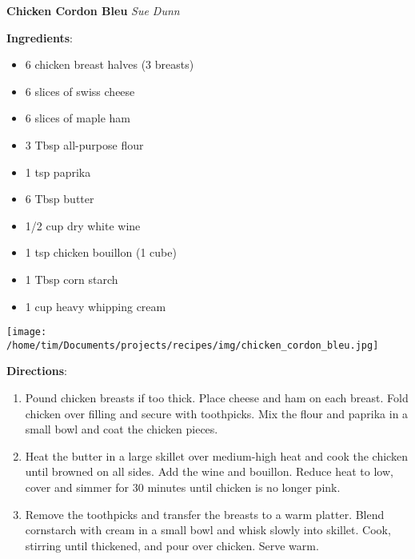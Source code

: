 \documentclass[11pt, twoside, openany]{book}
\begin{document}
\noindent\begin{minipage}[t]{\linewidth}%
{\Large\textbf{Chicken Cordon Bleu}} \label{chicken-cordon-bleu}\hfill\textit{Sue Dunn}\\
\noindent\begin{minipage}[t]{0.78\linewidth}%
\textbf{Ingredients}:\vspace{-3mm}
\begin{multicols}{2}
\begin{itemize}\setlength\itemsep{-1mm}
\item 6 chicken breast halves (3 breasts)
\item 6 slices of swiss cheese
\item 6 slices of maple ham
\item 3 Tbsp all-purpose flour
\item 1 tsp paprika
\item 6 Tbsp butter
\item 1/2 cup dry white wine
\item 1 tsp chicken bouillon (1 cube)
\item 1 Tbsp corn starch
\item 1 cup heavy whipping cream
\end{itemize}
\end{multicols}
\end{minipage}
\noindent\begin{minipage}[t]{0.18\linewidth}
\centering \strut\vspace*{-\baselineskip}\newline
\texttt{[image: /home/tim/Documents/projects/recipes/img/chicken\_cordon\_bleu.jpg]}\\
\end{minipage}\vspace{3mm}
\textbf{Directions}:
\vspace{-3mm}\begin{enumerate}\setlength\itemsep{-1mm}
\item Pound chicken breasts if too thick. Place cheese and ham on each breast. Fold chicken over filling and secure with toothpicks. Mix the flour and paprika in a small bowl and coat the chicken pieces.
\item Heat the butter in a large skillet over medium-high heat and cook the chicken until browned on all sides. Add the wine and bouillon. Reduce heat to low, cover and simmer for 30 minutes until chicken is no longer pink.
\item Remove the toothpicks and transfer the breasts to a warm platter. Blend cornstarch with cream in a small bowl and whisk slowly into skillet. Cook, stirring until thickened, and pour over chicken. Serve warm. 
\end{enumerate}
\end{minipage}\vspace{8mm}
\end{document}
